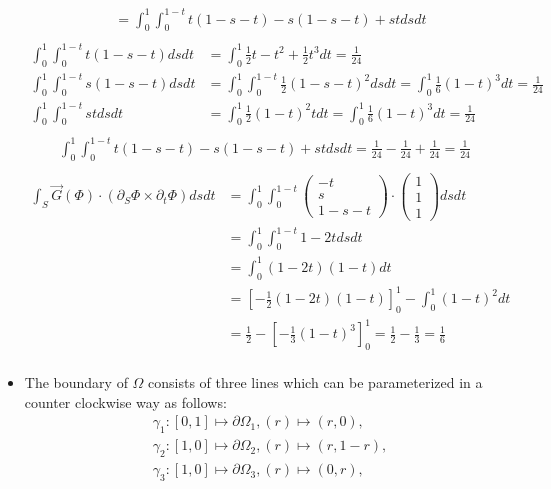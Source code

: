 \documentclass[11pt]{article}
\begin{document}
\begin{solution}
\begin{itemize}
\begin{align*}
	&= \int_0^1 \int_0^{1-t} t(1-s-t)-s(1-s-t)+st ds dt\\
	\end{align*}
	\begin{align*}
	\int_0^1 \int_0^{1-t} t(1-s-t) ds dt &= \int_0^1 \frac{1}{2}t -t^2 + \frac{1}{2}t^3 dt = \frac{1}{24}\\
	\int_0^1 \int_0^{1-t} s(1-s-t) ds dt &=\int_0^1 \int_0^{1-t} \frac{1}{2}(1-s-t)^2 ds dt =\int_0^1 \frac{1}{6}(1-t)^3 dt  =  \frac{1}{24}\\
	\int_0^1 \int_0^{1-t} st ds dt &=\int_0^1 \frac{1}{2}(1-t)^2t dt =\int_0^1 \frac{1}{6}(1-t)^3 dt  =  \frac{1}{24}\\
	\end{align*}
	\begin{align*}
	\int_0^1 \int_0^{1-t} t(1-s-t)-s(1-s-t)+st ds dt = \frac{1}{24} - \frac{1}{24} + \frac{1}{24} =  \frac{1}{24}\\
	\end{align*}
	\begin{align*}
	\int_S \vec{G}(\Phi) \cdot  ( \partial_S \Phi \times \partial_t \Phi ) dsdt &= \int_0^1 \int_0^{1-t} \begin{pmatrix}-t\\s\\1-s-t\end{pmatrix}\cdot  \begin{pmatrix}1\\1\\1\end{pmatrix} ds dt\\
	&= \int_0^1 \int_0^{1-t} 1-2t ds dt\\
	&= \int_0^1 (1-2t)(1-t) dt\\
	&= \left[-\frac{1}{2}(1-2t)(1-t)\right]_0^1 -\int_0^1 (1-t)^2 dt \\
	&= \frac{1}{2} -\left[-\frac{1}{3}(1-t)^3\right]_0^1 = \frac{1}{2} - \frac{1}{3} = \frac{1}{6}\\
	\end{align*}
     \item The boundary of $\Omega$ consists of three lines which can be parameterized in a counter clockwise way as follows:
	\begin{align*}
	&\gamma_1 : [0,1]\mapsto \partial \Omega_1, (r) \mapsto (r,0),\\
	&\gamma_2 : [1,0]\mapsto \partial \Omega_2, (r) \mapsto (r,1-r),\\
	&\gamma_3 : [1,0]\mapsto \partial \Omega_3, (r) \mapsto (0,r),
	\end{align*}

\end{itemize}
\end{solution}
\end{document}
